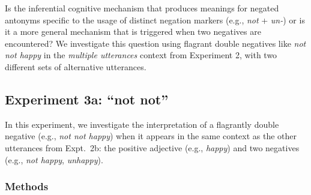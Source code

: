 \documentclass[floatsintext,doc]{apa6}
\begin{document}
Is the inferential cognitive mechanism that produces meanings for negated antonyms specific to the usage of distinct negation markers (e.g., \emph{not} + \emph{un-}) or is it a more general mechanism that is triggered when two negatives are encountered?
We investigate this question using flagrant double negatives like \emph{not not happy} in the \emph{multiple utterances} context from Experiment 2, with two different sets of alternative utterances. 


\subsection{Experiment 3a: ``not not''}

In this experiment, we investigate the interpretation of a flagrantly double negative (e.g., \emph{not not happy}) when it appears in the same context as the other utterances from Expt.~2b: the positive adjective (e.g., \emph{happy}) and two negatives (e.g., \emph{not happy}, \emph{unhappy}).

\subsubsection{Methods}
\end{document}
